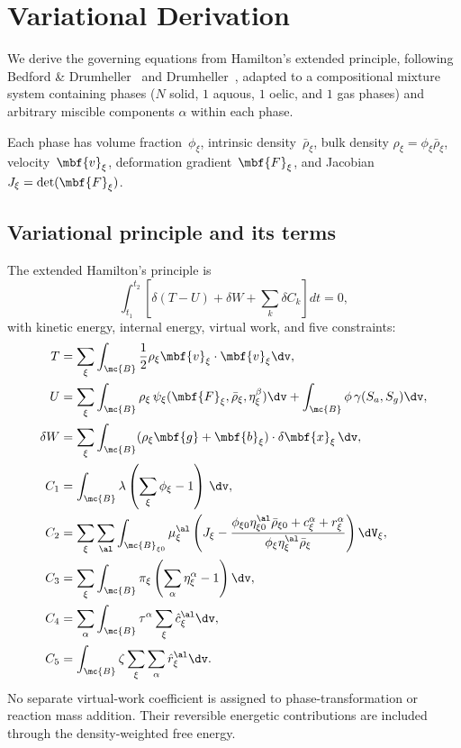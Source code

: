 \section{Variational Derivation}
\label{app:variational}
\label{sec:variational}

We derive the governing equations from Hamilton's extended principle, following Bedford \& Drumheller~\cite{drumheller1980thermomechanical} and Drumheller~\cite{drumheller2000}, adapted to a compositional mixture system containing phases ($N$ solid, $1$ aquous, $1$ oelic, and $1$ gas phases) and arbitrary miscible components $\alpha$ within each phase.

Each phase has volume fraction~$\phi_\xi$, intrinsic density~$\bar\rho_\xi$, bulk density $\rho_\xi = \phi_\xi\bar\rho_\xi$, velocity~$\mbf{v}_\xi$, deformation gradient~$\mbf{F}_\xi$, and Jacobian $J_\xi = \det(\mbf{F}_\xi)$.  

\subsection{Variational principle and its terms}

The extended Hamilton's principle is
\begin{equation*}
  \int_{t_1}^{t_2}\left[\delta(T - U) + \delta W + \sum_k \delta C_k\right] dt = 0,
\end{equation*}
with kinetic energy, internal energy, virtual work, and five constraints:
\begin{align}
T &= \sum_\xi \int_{\mc{B}}\frac{1}{2} \rho_\xi \mbf{v}_\xi \cdot \mbf{v}_\xi \dv,
  \label{eq:T_def} \\
  U &= \sum_{\xi}\int_{\mc{B}} \rho_{\xi}\,\psi_{\xi}(\mbf{F}_{\xi}, \bar\rho_{\xi}, \eta^\beta_{\xi})\dv
    + \int_{\mc{B}} \phi\,\gamma(S_a, S_g) \dv, 
  \label{eq:U_def} \\
  \delta W &= \sum_\xi \int_{\mc{B}} (\rho_\xi\mbf{g} + \mbf{b}_\xi)\cdot\delta\mbf{x}_\xi \,\dv,
  \label{eq:W_def} \\
  C_1 &= \int_{\mc{B}} \lambda\left(\sum_\xi\phi_\xi - 1\right) \,\dv,
  \label{eq:C1_def} \\
  C_2 &= \sum_\xi \sum_\al \int_{\mc{B}_{\xi 0}} \mu^\al_\xi \left( J_\xi - \frac{\phi_{\xi 0} \eta^\al_{\xi 0} \bar\rho_{\xi 0} + c_\xi^\alpha + r_\xi^\alpha}{\phi_\xi \eta^\al_\xi \bar\rho_\xi} \right) \dV_\xi, 
  \label{eq:C2_def} \\
  C_3 &= \sum_\xi \int_{\mc{B}} \pi_\xi \left( \sum_\alpha \eta_\xi^\alpha - 1 \right) \dv,
  \label{eq:C3_def} \\
  C_4 &= \sum_\alpha \int_{\mc{B}} \tau^\alpha \sum_\xi \hat{c}^\al_\xi \dv,
  \label{eq:C4_def} \\
  C_5 &= \int_{\mc{B}} \zeta \sum_\xi \sum_\alpha \hat r^\al_\xi \dv.
  \label{eq:C5_def}
\end{align}
%
No separate virtual-work coefficient is assigned to phase-transformation or
reaction mass addition.  Their reversible energetic contributions are included
through the density-weighted free energy.

